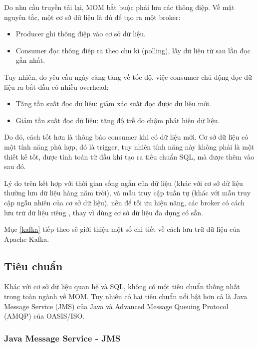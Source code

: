 \documentclass{article}
\begin{document}
Do nhu cầu truyền tải lại, MOM bắt buộc phải lưu các thông điệp. Về mặt nguyên
tắc, một cơ sở dữ liệu là đủ để tạo ra một broker:

\begin{itemize}
    \item Producer ghi thông điệp vào cơ sở dữ liệu.
    \item Consumer đọc thông điệp ra theo chu kì (polling), lấy dữ liệu từ sau
    lần đọc gần nhất.
\end{itemize}

Tuy nhiên, do yêu cầu ngày càng tăng về tốc độ, việc consumer chủ động đọc dữ
liệu ra bắt đầu có nhiều overhead:

\begin{itemize}
    \item Tăng tần suất đọc dữ liệu: giảm xác suất đọc được dữ liệu mới.
    \item Giảm tần suất đọc dữ liệu: tăng độ trễ do chậm phát hiện dữ liệu.
\end{itemize}

Do đó, cách tốt hơn là thông báo consumer khi có dữ liệu mới. Cơ sở dữ liệu có
một tính năng phù hợp, đó là trigger, tuy nhiên tính năng này không phải là một
thiết kế tốt, được tính toán từ đầu khi tạo ra tiêu chuẩn SQL, mà được thêm vào
sau đó.

Lý do trên kết hợp với thời gian sống ngắn của dữ liệu (khác với cơ sở dữ liệu
thường lưu dữ liệu hàng năm trời), và mẫu truy cập tuần tự (khác với mẫu truy
cập ngẫu nhiên của cơ sở dữ liệu), nên để tối ưu hiệu năng, các broker có cách
lưu trữ dữ liệu riêng \cite{monitor_stream}, thay vì dùng cơ sở dữ liệu đa dụng
có sẵn.

Mục \ref{kafka} tiếp theo sẽ giới thiệu một số chi tiết về cách lưu trữ dữ liệu
của Apache Kafka.

\subsection{Tiêu chuẩn}

Khác với cơ sở dữ liệu quan hệ và SQL, không có một tiêu chuẩn thống nhất trong
toàn ngành về MOM. Tuy nhiên có hai tiêu chuẩn nổi bật hơn cả là Java Message
Service (JMS) của Java và Advanced Message Queuing Protocol (AMQP) của OASIS/ISO.

\subsubsection{Java Message Service - JMS}
\end{document}
